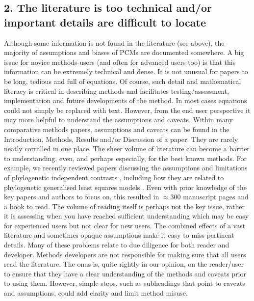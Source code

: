 \documentclass[a4paper,12pt]{article}
\begin{document}
  \subsection{2. The literature is too technical and/or important details are difficult to locate}
    Although some information is not found in the literature (see above), the majority of assumptions and biases of PCMs are documented somewhere. 
    A big issue for novice methods-users (and often for advanced users too) is that this information can be extremely technical and dense.
    It is not unusual for papers to be long, tedious and full of equations. 
    Of course, such detail and mathematical literacy is critical in describing methods and facilitates testing/assessment, implementation and future developments of the method.
    In most cases equations could not simply be replaced with text.
   However, from the end user perspective it may more helpful to understand the assumptions and caveats.
   Within many comparative methods papers, assumptions and caveats can be found in the Introduction, Methods, Results and/or Discussion of a paper. 
    They are rarely neatly corralled in one place.
     The sheer volume of literature can become a barrier to understanding, even, and perhaps especially, for the best known methods.
     For example, we recently reviewed papers discussing the assumptions and limitations of phylogenetic independent contrasts \citep{felsenstein1985phylogenies}, including how they are related to phylogenetic generalised least squares models \citep{garland2000using,rohle2006comment,blomberg2012independent}. 
    Even with prior knowledge of the key papers and authors to focus on, this resulted in $\approx 300$ manuscript pages and a book to read.
    The volume of reading itself is perhaps not the key issue, rather it is assessing when you have reached sufficient understanding which may be easy for experienced users but not clear for new users.    
    The combined effects of a vast literature and sometimes opaque assumptions make it easy to miss pertinent details.
    Many of these problems relate to due diligence for both reader and developer. 
    Methods developers are not responsible for making sure that all users read the literature. 
    The onus is, quite rightly in our opinion, on the reader/user to ensure that they have a clear understanding of the methods and caveats prior to using them. 
    However, simple steps, such as subheadings that point to caveats and assumptions, could add clarity and limit method misuse. 
\end{document}
